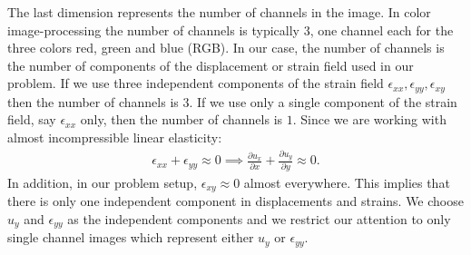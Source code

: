 \documentclass[12pt]{article}
\newcommand{\pdd}[2]{\frac{\partial{{#1}}}{\partial{#2}}}
\begin{document}
The last dimension represents the number of channels in the image. In color image-processing the number of channels is typically $3$, one channel each for the three colors red, green and blue (RGB). In our case, the number of channels is the number of components of the displacement or strain field used in our problem. If we use three independent components of the strain field $\epsilon_{xx},\epsilon_{yy},\epsilon_{xy}$ then the number of channels is $3$. If we use only a single component of the strain field, say $\epsilon_{xx}$ only, then the number of channels is $1$.
Since we are working with almost incompressible linear elasticity:
\begin{align}
  \epsilon_{xx}+\epsilon_{yy}\approx{0} \implies \pdd{u_x}{x} + \pdd{u_y}{y} \approx{0}.
\end{align}
In addition, in our problem setup, $\epsilon_{xy}\approx{0}$ almost everywhere. This implies that there is only one independent component in displacements and strains. We choose $u_y$ and $\epsilon_{yy}$ as the independent components and we restrict our attention to only single channel images which represent either $u_y$ or $\epsilon_{yy}$.
\end{document}
